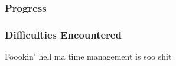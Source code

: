 
\subsubsection{Progress}
\subsubsection{Difficulties Encountered}
Foookin' hell ma time management is soo shit